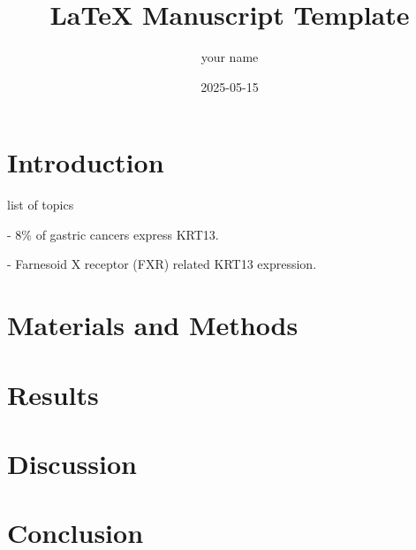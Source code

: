 \documentclass{article}
\begin{document}
\title{LaTeX Manuscript Template}
\author{your name}
\date{2025-05-15}

\maketitle



\section{Introduction}

list of topics

- 8\% of gastric cancers express KRT13.
\cite{lennartzCytokeratin13CK132023}

- Farnesoid X receptor (FXR) related KRT13 expression.
\cite{lianFarnesoidReceptorProtects2011}

\section{Materials and Methods}

\section{Results}

\section{Discussion}

\section{Conclusion}




\end{document}

